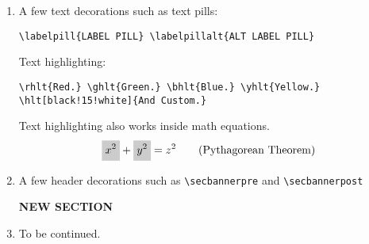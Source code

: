 \begin{enumerate}
\item A few text decorations such as text pills:  
    \begin{center}
        \verb"\labelpill{LABEL PILL} \labelpillalt{ALT LABEL PILL}"
    \end{center}
    Text highlighting:     
    \begin{center}
        \verb"\rhlt{Red.} \ghlt{Green.} \bhlt{Blue.} \yhlt{Yellow.}" \\
        \verb"\hlt[black!15!white]{And Custom.}"
    \end{center}
    Text highlighting also works inside math equations.
    \begin{equation}
        \hlt{x^2} + \hlt{y^2} = z^2  \tag{Pythagorean Theorem}
    \end{equation}

\item A few header decorations such as \verb"\secbannerpre" and \verb"\secbannerpost"
    \begin{center}
        \Large\heavierfont\bfseries{}
        \secbannerpre{}
        NEW SECTION
        \secbannerpost{}
    \end{center}

\item To be continued.

\end{enumerate}

